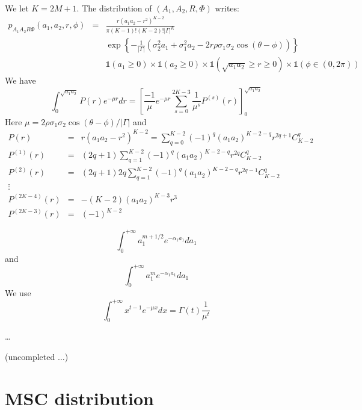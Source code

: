We let $K=2M+1$.
The distribution of $(A_{1},A_{2},R,\Phi)$ writes:
\begin{eqnarray}
\label{eq:wiskart}
 p_{A_{1}A_{2}R\Phi}
 (a_{1},a_{2},r,\phi)
 &=& %
 \frac{r(a_{1}a_{2}-r^{2})^{K-2}}{\pi (K-1)!(K-2)!|\Gamma|^{K}}
 \\
 && \nonumber
 \exp\left\{
 -\frac{1}{|\Gamma|}
 \left(\sigma_{2}^{2}a_{1}+\sigma_{1}^{2}a_{2}
 -2r\rho\sigma_{1}\sigma_{2}\cos(\theta-\phi)
 \right)
 \right\}
 \\
 &&\nonumber
 \mathds{1}(a_{1}\geq 0)
 \times\mathds{1}(a_{2}\geq 0)
 \times\mathds{1}(\sqrt{a_{1}a_{2}}\geq r\geq 0)
 \times\mathds{1}(\phi\in(0,2\pi))
\end{eqnarray}
We have
$$
 \int_{0}^{\sqrt{a_{1}a_{2}}} P(r)e^{-\mu r}dr = 
 \left[\frac{-1}{\mu}e^{-\mu r}\sum_{s=0}^{2K-3}\frac{1}{\mu^{s}}P^{(s)}(r)
 \right]_{0}^{\sqrt{a_{1}a_{2}}}
$$
Here $\mu = 2\rho\sigma_{1}\sigma_{2}\cos(\theta-\phi)/|\Gamma|$ and
\begin{eqnarray*}
 P(r)&=&r(a_{1}a_{2}-r^{2})^{K-2}=\sum_{q=0}^{K-2}(-1)^{q}
 (a_{1}a_{2})^{K-2-q}r^{2q+1}C_{K-2}^{q}
 \\
 P^{(1)}(r)&=&(2q+1)\sum_{q=1}^{K-2}(-1)^{q}
 (a_{1}a_{2})^{K-2-q}r^{2q}C_{K-2}^{q}
 \\
 P^{(2)}(r)&=&(2q+1)2q
 \sum_{q=1}^{K-2}(-1)^{q}
(a_{1}a_{2})^{K-2-q}r^{2q-1}C_{K-2}^{q}
 \\
 \vdots
 \\
 P^{(2K-4)}(r)&=&-(K-2)(a_{1}a_{2})^{K-3}r^{3}
 \\
 P^{(2K-3)}(r)&=&(-1)^{K-2}
\end{eqnarray*}

\newpage
$$
 \int_{0}^{+\infty} a_{1}^{m+1/2}e^{-\alpha_{1}a_{1}}da_{1}
$$
and
$$
 \int_{0}^{+\infty} a_{1}^{m}e^{-\alpha_{1}a_{1}}da_{1}
$$
We use
$$
 \int_{0}^{+\infty} x^{t-1}e^{-\mu x}dx =\Gamma(t)\frac{1}{\mu^{t}}
$$

\dots

(uncompleted $\ldots$)





\section{MSC distribution}

